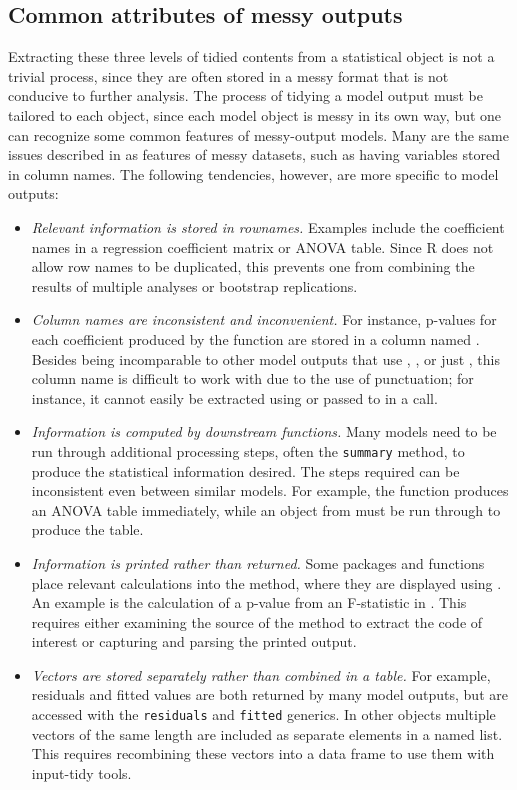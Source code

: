 \subsection{Common attributes of messy outputs}

Extracting these three levels of tidied contents from a statistical object is not a trivial process, since they are often stored in a messy format that is not conducive to further analysis. The process of tidying a model output must be tailored to each object, since each model object is messy in its own way, but one can recognize some common features of messy-output models. Many are the same issues described in \citet{Wickham:2014vp} as features of messy datasets, such as having variables stored in column names. The following tendencies, however, are more specific to model outputs:

\begin{itemize}
\item \emph{Relevant information is stored in rownames.} Examples include the coefficient names in a regression coefficient matrix or ANOVA table. Since R does not allow row names to be duplicated, this prevents one from combining the results of multiple analyses or bootstrap replications.
\item \emph{Column names are inconsistent and inconvenient.} For instance, p-values for each coefficient produced by the  function are stored in a column named . Besides being incomparable to other model outputs that use , , or just , this column name is difficult to work with due to the use of punctuation; for instance, it cannot easily be extracted using \samp{\$} or passed to  in a  call.
\item \emph{Information is computed by downstream functions.} Many models need to be run through additional processing steps, often the \texttt{summary} method, to produce the statistical information desired. The steps required can be inconsistent even between similar models. For example, the  function produces an ANOVA table immediately, while an object from  must be run through  to produce the table.
\item \emph{Information is printed rather than returned.} Some packages and functions place relevant calculations into the  method, where they are displayed using . An example is the calculation of a p-value from an F-statistic in . This requires either examining the source of the  method to extract the code of interest or capturing and parsing the printed output.
\item \emph{Vectors are stored separately rather than combined in a table.} For example, residuals and fitted values are both returned by many model outputs, but are accessed with the \texttt{residuals} and \texttt{fitted} generics. In other objects multiple vectors of the same length are included as separate elements in a named list. This requires recombining these vectors into a data frame to use them with input-tidy tools.
\end{itemize}

